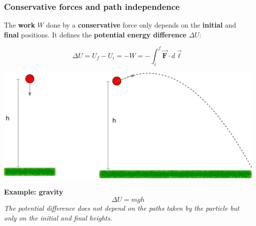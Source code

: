 \documentclass{beamer}
\makeatletter
\newcommand{\vc}[1]{\vec{\boldsymbol{#1}}}
\let\HL\hl
\renewcommand\hl{%
  \let\set@color\beamerorig@set@color
  \let\reset@color\beamerorig@reset@color
  \HL}
\makeatother
\begin{document}
\begin{frame}

\frametitle{Conservative forces and path independence}
\footnotesize

%

The \textbf{work} $W$ done by a \textbf{conservative} force only depends on the \textbf{initial} and \textbf{final} positions. It defines the \textbf{potential energy difference} $\Delta U$:

\begin{block}{}
\begin{equation}
	\Delta U = U_f-U_i = - W   = -\int_i^f \vc{F}\cdot d\vc{\ell}
\end{equation}
\end{block}
\begin{center}
	\includegraphics[width=0.7\columnwidth]{figs/paths}

\end{center}

\textbf{Example: gravity}
\begin{equation}
	\Delta U = m g h
\end{equation}
\textit{The potential difference does not depend on the paths taken by the particle but only on the initial and final heights. }
	
\end{frame}
\end{document}
